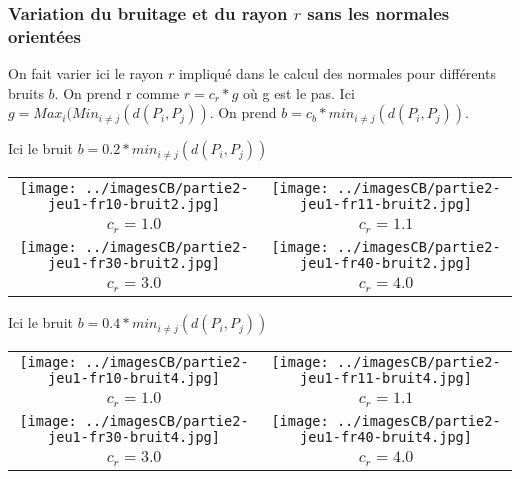 \documentclass[11pt,a4paper]{article}
\begin{document}
\subsubsection{Variation du bruitage et du rayon $r$ sans les normales orientées}
On fait varier ici le rayon $r$ impliqué dans le calcul des normales pour différents bruits $b$. On prend r comme $r=c_r*g$ où g est le pas. Ici
$g=Max_i(Min_{i \neq j}(d(P_i,P_j))$. On prend $b=c_b*min_{i \neq j}(d(P_i,P_j))$.

\pagebreak

Ici le bruit $b=0.2*min_{i \neq j}(d(P_i,P_j))$
\begin{center}
\begin{tabular}{|c|c|}
\hline
\texttt{[image: ../imagesCB/partie2-jeu1-fr10-bruit2.jpg]} & \texttt{[image: ../imagesCB/partie2-jeu1-fr11-bruit2.jpg]} \\
$c_r=1.0$                                                             & $c_r=1.1$ \\
\hline
\texttt{[image: ../imagesCB/partie2-jeu1-fr30-bruit2.jpg]} & \texttt{[image: ../imagesCB/partie2-jeu1-fr40-bruit2.jpg]} \\
$c_r=3.0$                                                             & $c_r=4.0$ \\
\hline
\end{tabular}
\end{center}

\pagebreak

Ici le bruit $b=0.4*min_{i \neq j}(d(P_i,P_j))$
\begin{center}
\begin{tabular}{|c|c|}
\hline
\texttt{[image: ../imagesCB/partie2-jeu1-fr10-bruit4.jpg]} & \texttt{[image: ../imagesCB/partie2-jeu1-fr11-bruit4.jpg]} \\
$c_r=1.0$                                                             & $c_r=1.1$ \\
\hline
\texttt{[image: ../imagesCB/partie2-jeu1-fr30-bruit4.jpg]} & \texttt{[image: ../imagesCB/partie2-jeu1-fr40-bruit4.jpg]} \\
$c_r=3.0$                                                             & $c_r=4.0$ \\
\hline
\end{tabular}
\end{center}

\pagebreak
\end{document}
